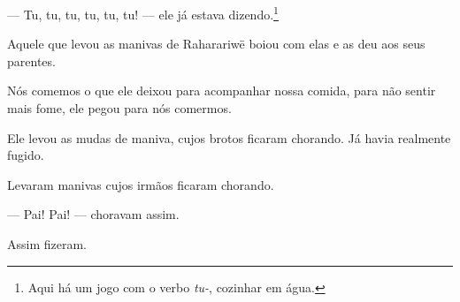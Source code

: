 --- Tu, tu, tu, tu, tu, tu! --- ele já estava dizendo.\footnote{   Aqui há um jogo com o verbo \emph{tu-}, cozinhar em água.}

Aquele que levou as manivas de Raharariwë boiou com elas e as deu aos
seus parentes. 

Nós comemos o que ele deixou para acompanhar nossa comida, para não
sentir mais fome, ele pegou para nós comermos. 

Ele levou as mudas de maniva, cujos brotos ficaram chorando. Já havia
realmente fugido. 

Levaram manivas cujos irmãos ficaram chorando. 

--- Pai! Pai! --- choravam assim. 

Assim fizeram.